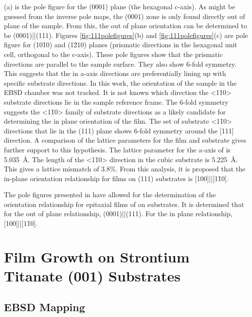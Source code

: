 (a) is the pole figure for the (0001) plane (the hexagonal c-axis). As might be guessed from the inverse pole maps, the (0001) zone is only found directly out of plane of the sample. From this, the out of plane orientation can be determined to be (0001)||(111). Figures \ref{fig:111polefigures}(b) and \ref{fig:111polefigures}(c) are pole figure for (10\={1}0) and (1\={2}10) planes (prismatic directions in the hexagonal unit cell, orthogonal to the c-axis). These pole figures show that the prismatic directions are parallel to the sample surface. They also show 6-fold  symmetry. This suggests that the in a-axis directions are preferentially lining up with specific substrate directions. In this work, the orientation of the sample in the EBSD chamber was not tracked. It is not known which direction the <1\={1}0> substrate directions lie in the sample reference frame. The 6-fold symmetry suggests the <1\={1}0> family of substrate directions as a likely candidate for determining the in plane orientation of the  film. The set of substrate <1\={1}0> directions that lie in the (111) plane shows 6-fold symmetry around the [111] direction. A comparison of the lattice parameters for the film and substrate gives further support to this hypothesis. The lattice parameter for the a-axis of  is \SI{5.035}{\angstrom}. The length of the <1\={1}0> direction in the cubic substrate is \SI{5.225}{\angstrom}. This gives a lattice mismatch of 3.8\%. From this analysis, it is proposed that the in-plane orientation relationship for  films on  (111) substrates is [100]||[1\={1}0]. 

The pole figures presented in  have allowed for the determination of the orientation relationship for epitaxial films of  on  substrates. It is determined that for the out of plane relationship, (0001)||(111). For the in plane relationship, [100]||[1\={1}0].


\section{Film Growth on Strontium Titanate (001) Substrates}
\label{sec:single.growth.001}


\subsection{EBSD Mapping}
\label{subsec:single.growth.mapping}



